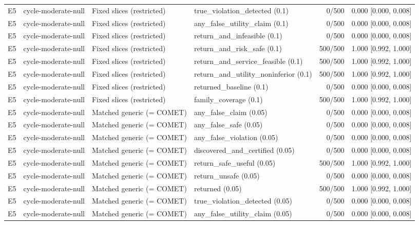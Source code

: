 \begin{longtable}{p{.04\linewidth}p{.18\linewidth}p{.19\linewidth}p{.16\linewidth}r p{.21\linewidth}}
E5 & cycle-moderate-null & Fixed slices (restricted) & true\_violation\_detected (0.1) & 0/500 & 0.000 [0.000, 0.008]\\
E5 & cycle-moderate-null & Fixed slices (restricted) & any\_false\_utility\_claim (0.1) & 0/500 & 0.000 [0.000, 0.008]\\
E5 & cycle-moderate-null & Fixed slices (restricted) & return\_and\_infeasible (0.1) & 0/500 & 0.000 [0.000, 0.008]\\
E5 & cycle-moderate-null & Fixed slices (restricted) & return\_and\_risk\_safe (0.1) & 500/500 & 1.000 [0.992, 1.000]\\
E5 & cycle-moderate-null & Fixed slices (restricted) & return\_and\_service\_feasible (0.1) & 500/500 & 1.000 [0.992, 1.000]\\
E5 & cycle-moderate-null & Fixed slices (restricted) & return\_and\_utility\_noninferior (0.1) & 500/500 & 1.000 [0.992, 1.000]\\
E5 & cycle-moderate-null & Fixed slices (restricted) & returned\_baseline (0.1) & 0/500 & 0.000 [0.000, 0.008]\\
E5 & cycle-moderate-null & Fixed slices (restricted) & family\_coverage (0.1) & 500/500 & 1.000 [0.992, 1.000]\\
E5 & cycle-moderate-null & Matched generic (= COMET) & any\_false\_claim (0.05) & 0/500 & 0.000 [0.000, 0.008]\\
E5 & cycle-moderate-null & Matched generic (= COMET) & any\_false\_safe (0.05) & 0/500 & 0.000 [0.000, 0.008]\\
E5 & cycle-moderate-null & Matched generic (= COMET) & any\_false\_violation (0.05) & 0/500 & 0.000 [0.000, 0.008]\\
E5 & cycle-moderate-null & Matched generic (= COMET) & discovered\_and\_certified (0.05) & 0/500 & 0.000 [0.000, 0.008]\\
E5 & cycle-moderate-null & Matched generic (= COMET) & return\_safe\_useful (0.05) & 500/500 & 1.000 [0.992, 1.000]\\
E5 & cycle-moderate-null & Matched generic (= COMET) & return\_unsafe (0.05) & 0/500 & 0.000 [0.000, 0.008]\\
E5 & cycle-moderate-null & Matched generic (= COMET) & returned (0.05) & 500/500 & 1.000 [0.992, 1.000]\\
E5 & cycle-moderate-null & Matched generic (= COMET) & true\_violation\_detected (0.05) & 0/500 & 0.000 [0.000, 0.008]\\
E5 & cycle-moderate-null & Matched generic (= COMET) & any\_false\_utility\_claim (0.05) & 0/500 & 0.000 [0.000, 0.008]\\

\end{longtable}
